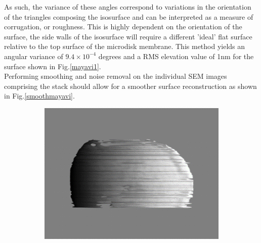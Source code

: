 As such, the variance of these angles correspond to variations in the orientation of the triangles composing the isosurface and can be interpreted as a measure of corrugation, or roughness.  This is highly dependent on the orientation of the surface, the side walls of the isosurface will require a different 'ideal' flat surface relative to the top surface of the microdisk membrane. This method yields an angular variance of $9.4 \times 10^{-4}$ degrees and a RMS elevation value of 1nm for the surface shown in Fig.\ref{mayavi1}.\\
Performing smoothing and noise removal on the individual SEM images comprising the stack should allow for a smoother surface reconstruction as shown in Fig.\ref{smoothmayavi}. 

\begin{figure}[h]
	\hspace*{0.5cm}
	\begin{subfigure}[b]{0.48\textwidth}
		\centering
		\includegraphics[width=1\linewidth]{Figs/Ch4/may2}
		\caption{}
		

\end{subfigure}
\end{figure}
